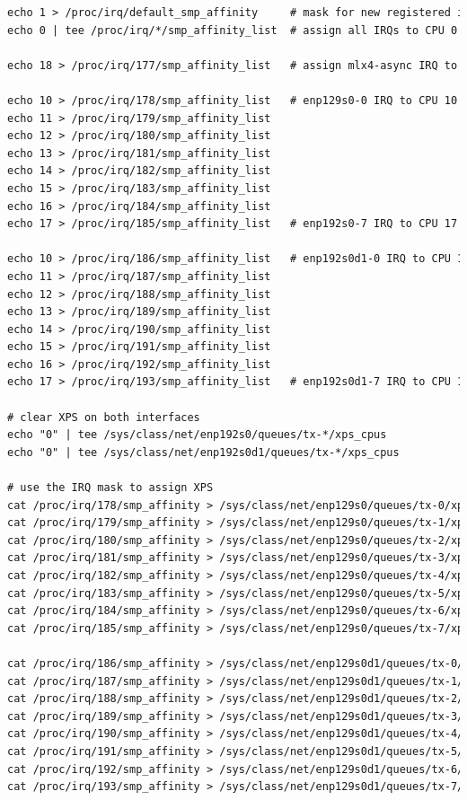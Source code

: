 \begin{lstlisting}[language=TeX]
echo 1 > /proc/irq/default_smp_affinity     # mask for new registered irqs
echo 0 | tee /proc/irq/*/smp_affinity_list  # assign all IRQs to CPU 0

echo 18 > /proc/irq/177/smp_affinity_list   # assign mlx4-async IRQ to CPU 18

echo 10 > /proc/irq/178/smp_affinity_list   # enp129s0-0 IRQ to CPU 10
echo 11 > /proc/irq/179/smp_affinity_list
echo 12 > /proc/irq/180/smp_affinity_list
echo 13 > /proc/irq/181/smp_affinity_list
echo 14 > /proc/irq/182/smp_affinity_list
echo 15 > /proc/irq/183/smp_affinity_list
echo 16 > /proc/irq/184/smp_affinity_list
echo 17 > /proc/irq/185/smp_affinity_list   # enp192s0-7 IRQ to CPU 17

echo 10 > /proc/irq/186/smp_affinity_list   # enp192s0d1-0 IRQ to CPU 10
echo 11 > /proc/irq/187/smp_affinity_list
echo 12 > /proc/irq/188/smp_affinity_list
echo 13 > /proc/irq/189/smp_affinity_list
echo 14 > /proc/irq/190/smp_affinity_list
echo 15 > /proc/irq/191/smp_affinity_list
echo 16 > /proc/irq/192/smp_affinity_list
echo 17 > /proc/irq/193/smp_affinity_list   # enp192s0d1-7 IRQ to CPU 17

# clear XPS on both interfaces
echo "0" | tee /sys/class/net/enp192s0/queues/tx-*/xps_cpus
echo "0" | tee /sys/class/net/enp192s0d1/queues/tx-*/xps_cpus

# use the IRQ mask to assign XPS
cat /proc/irq/178/smp_affinity > /sys/class/net/enp129s0/queues/tx-0/xps_cpus
cat /proc/irq/179/smp_affinity > /sys/class/net/enp129s0/queues/tx-1/xps_cpus
cat /proc/irq/180/smp_affinity > /sys/class/net/enp129s0/queues/tx-2/xps_cpus
cat /proc/irq/181/smp_affinity > /sys/class/net/enp129s0/queues/tx-3/xps_cpus
cat /proc/irq/182/smp_affinity > /sys/class/net/enp129s0/queues/tx-4/xps_cpus
cat /proc/irq/183/smp_affinity > /sys/class/net/enp129s0/queues/tx-5/xps_cpus
cat /proc/irq/184/smp_affinity > /sys/class/net/enp129s0/queues/tx-6/xps_cpus
cat /proc/irq/185/smp_affinity > /sys/class/net/enp129s0/queues/tx-7/xps_cpus

cat /proc/irq/186/smp_affinity > /sys/class/net/enp129s0d1/queues/tx-0/xps_cpus
cat /proc/irq/187/smp_affinity > /sys/class/net/enp129s0d1/queues/tx-1/xps_cpus
cat /proc/irq/188/smp_affinity > /sys/class/net/enp129s0d1/queues/tx-2/xps_cpus
cat /proc/irq/189/smp_affinity > /sys/class/net/enp129s0d1/queues/tx-3/xps_cpus
cat /proc/irq/190/smp_affinity > /sys/class/net/enp129s0d1/queues/tx-4/xps_cpus
cat /proc/irq/191/smp_affinity > /sys/class/net/enp129s0d1/queues/tx-5/xps_cpus
cat /proc/irq/192/smp_affinity > /sys/class/net/enp129s0d1/queues/tx-6/xps_cpus
cat /proc/irq/193/smp_affinity > /sys/class/net/enp129s0d1/queues/tx-7/xps_cpus
\end{lstlisting}
